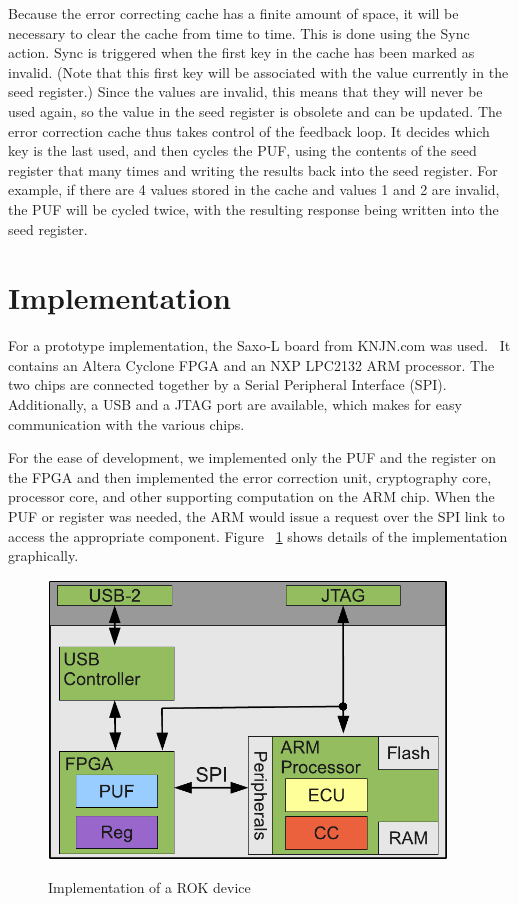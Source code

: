 Because the error correcting cache has a finite amount of space, it will be necessary to clear the cache from time to
time. This is done using the Sync action. Sync is triggered when the first key in the cache has been marked as invalid.
(Note that this first key will be associated with the value currently in the seed register.) Since the values are invalid,
this means that they will never be used again, so the value in the seed register is obsolete and can be updated.
The error correction cache thus takes control of the feedback loop. It decides which key is the last used, and then cycles
the PUF, using the contents of the seed register that many times and writing the results back into the seed register.
For example, if there are 4 values stored in the cache and values 1 and 2 are invalid, the PUF will be cycled twice,
with the resulting response being written into the seed register.

\section{Implementation}
For a prototype implementation, the Saxo-L board from KNJN.com was used.~\cite{KNJN} It contains an Altera
Cyclone FPGA and an NXP LPC2132 ARM processor. The two chips are connected together by a Serial Peripheral
Interface (SPI). Additionally, a USB and a JTAG port are available, which makes for easy communication with the
various chips.

For the ease of development, we implemented only the PUF and the register on the FPGA and then implemented
the error correction unit, cryptography core, processor core, and other supporting computation on the ARM chip. 
When the PUF or register was needed, the ARM would issue a request over the SPI link to access the appropriate component.
Figure ~\ref{fig:rokimpl} shows details of the implementation graphically.

\begin{figure}[!ht]
\includegraphics[width=400px]{images/rok.pdf}
\label{fig:rokimpl}
\caption{Implementation of a ROK device}
\vspace{-20pt}
\end{figure}
\FloatBarrier

